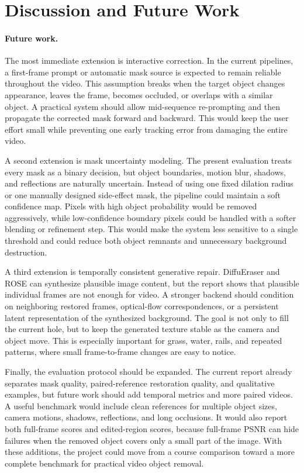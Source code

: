 \documentclass[10pt,twocolumn,letterpaper]{article}
\begin{document}
\section{Discussion and Future Work}
\paragraph{Future work.}
The most immediate extension is interactive correction. In the current pipelines, a first-frame prompt or automatic mask source is expected to remain reliable throughout the video. This assumption breaks when the target object changes appearance, leaves the frame, becomes occluded, or overlaps with a similar object. A practical system should allow mid-sequence re-prompting and then propagate the corrected mask forward and backward. This would keep the user effort small while preventing one early tracking error from damaging the entire video.

A second extension is mask uncertainty modeling. The present evaluation treats every mask as a binary decision, but object boundaries, motion blur, shadows, and reflections are naturally uncertain. Instead of using one fixed dilation radius or one manually designed side-effect mask, the pipeline could maintain a soft confidence map. Pixels with high object probability would be removed aggressively, while low-confidence boundary pixels could be handled with a softer blending or refinement step. This would make the system less sensitive to a single threshold and could reduce both object remnants and unnecessary background destruction.

A third extension is temporally consistent generative repair. DiffuEraser and ROSE can synthesize plausible image content, but the report shows that plausible individual frames are not enough for video. A stronger backend should condition on neighboring restored frames, optical-flow correspondences, or a persistent latent representation of the synthesized background. The goal is not only to fill the current hole, but to keep the generated texture stable as the camera and object move. This is especially important for grass, water, rails, and repeated patterns, where small frame-to-frame changes are easy to notice.

Finally, the evaluation protocol should be expanded. The current report already separates mask quality, paired-reference restoration quality, and qualitative examples, but future work should add temporal metrics and more paired videos. A useful benchmark would include clean references for multiple object sizes, camera motions, shadows, reflections, and long occlusions. It would also report both full-frame scores and edited-region scores, because full-frame PSNR can hide failures when the removed object covers only a small part of the image. With these additions, the project could move from a course comparison toward a more complete benchmark for practical video object removal.
\end{document}

